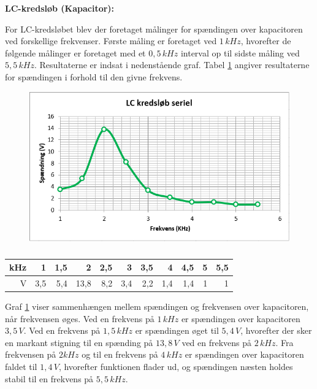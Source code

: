\textbf{LC-kredsløb (Kapacitor):}

For LC-kredsløbet blev der foretaget målinger for spændingen over kapacitoren ved forskellige frekvenser. Første måling er foretaget ved $1 \, kHz$, hvorefter de følgende målinger er foretaget med et $0,5\, kHz$ interval op til sidste måling ved $5,5\, kHz$. Resultaterne er indsat i nedenstående graf. Tabel \ref{tabular:lcserie} angiver resultaterne for spændingen i forhold til den givne frekvens.

\begin{figure}[H]
\includegraphics[scale=1]{Setup/Graf3}
\caption{}
\label{graph:lcserie}
\end{figure}

\begin{table}[H]
\centering
\begin{tabular}{|r|r|r|r|r|r|r|r|r|r|r|} \hline
kHz & 1 & 1,5 & 2 & 2,5 & 3 & 3,5 & 4 & 4,5 & 5 & 5,5 \\ \hline
V & 3,5 & 5,4 & 13,8 & 8,2 & 3,4 & 2,2 & 1,4 & 1,4 & 1 & 1 \\ \hline
\end{tabular}
\caption{}
\label{tabular:lcserie}
\end{table}

Graf \ref{graph:lcserie} viser sammenhængen mellem spændingen og frekvensen over kapacitoren, når frekvensen øges. Ved en frekvens på $1\, kHz$ er spændingen over kapacitoren $3,5\, V$. Ved en frekvens på $1,5\, kHz$ er spændingen øget til $5,4\, V$, hvorefter der sker en markant stigning til en spænding på $13,8\, V$ ved en frekvens på $2\, kHz$. Fra frekvensen på $2 kHz$ og til en frekvens på $4\, kHz$ er spændingen over kapacitoren faldet til $1,4\, V$, hvorefter funktionen flader ud, og spændingen næsten holdes stabil til en frekvens på $5,5\, kHz$.

